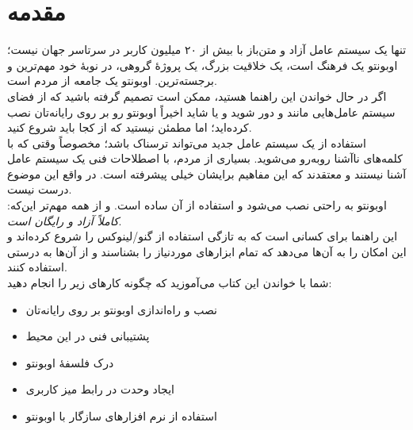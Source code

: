 \chapter{مقدمه}
\emph{} تنها یک سیستم عامل آزاد و متن‌باز  با بیش از ۲۰ میلیون کاربر در سرتاسر جهان نیست؛ اوبونتو یک فرهنگ است، یک خلاقیت بزرگ، یک پروژهٔ گروهی، در نوبهٔ خود مهم‌ترین و برجسته‌ترین. اوبونتو یک جامعه از مردم است.\\
اگر در حال خواندن این راهنما هستید، ممکن است تصمیم گرفته باشید که از فضای سیستم عامل‌هایی مانند  و  دور شوید و یا شاید اخیراً اوبونتو رو بر روی رایانه‌تان نصب کرده‌اید؛ اما مطمئن نیستید که از کجا باید شروع کنید.\\
استفاده از یک سیستم عامل جدید می‌تواند ترسناک باشد؛ مخصوصاً وقتی که با کلمه‌های ناآشنا روبه‌رو می‌شوید. بسیاری از مردم، با اصطلاحات فنی یک سیستم عامل آشنا نیستند و معتقدند که این مفاهیم برایشان خیلی پیشرفته است. در واقع این موضوع درست نیست.\\
اوبونتو به راحتی نصب می‌شود و استفاده از آن ساده است. و از همه مهم‌تر این‌که: \emph{کاملاً آزاد و  رایگان است}.\\

این راهنما برای کسانی است که به تازگی استفاده از گنو/لینوکس را شروع کرده‌اند و این امکان را به آن‌ها می‌دهد که تمام ابزارهای موردنیاز را بشناسند و از آن‌ها به درستی استفاده کنند.\\
شما با خواندن این کتاب می‌آموزید که چگونه کارهای زیر را انجام دهید:\\
\begin{itemize}
\item نصب و راه‌اندازی اوبونتو بر روی رایانه‌تان
\item پشتیبانی فنی در این محیط
\item درک فلسفهٔ اوبونتو
\item ایجاد وحدت در رابط میز کاربری
\item استفاده از نرم افزارهای سازگار با اوبونتو
\end{itemize}
